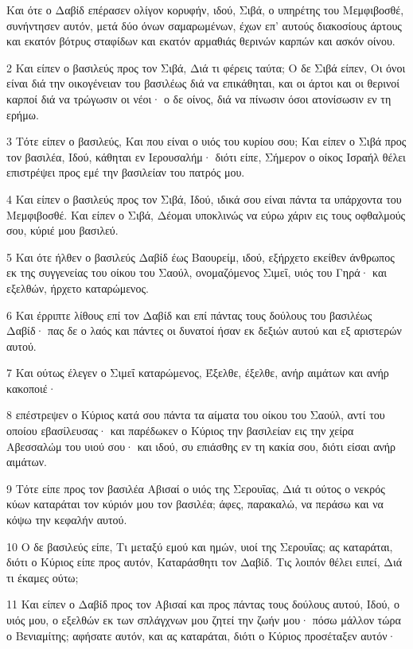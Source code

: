 \par Και ότε ο Δαβίδ επέρασεν ολίγον κορυφήν, ιδού, Σιβά, ο υπηρέτης του Μεμφιβοσθέ, συνήντησεν αυτόν, μετά δύο όνων σαμαρωμένων, έχων επ' αυτούς διακοσίους άρτους και εκατόν βότρυς σταφίδων και εκατόν αρμαθιάς θερινών καρπών και ασκόν οίνου.
\par 2 Και είπεν ο βασιλεύς προς τον Σιβά, Διά τι φέρεις ταύτα; Ο δε Σιβά είπεν, Οι όνοι είναι διά την οικογένειαν του βασιλέως διά να επικάθηται, και οι άρτοι και οι θερινοί καρποί διά να τρώγωσιν οι νέοι· ο δε οίνος, διά να πίνωσιν όσοι ατονίσωσιν εν τη ερήμω.
\par 3 Τότε είπεν ο βασιλεύς, Και που είναι ο υιός του κυρίου σου; Και είπεν ο Σιβά προς τον βασιλέα, Ιδού, κάθηται εν Ιερουσαλήμ· διότι είπε, Σήμερον ο οίκος Ισραήλ θέλει επιστρέψει προς εμέ την βασιλείαν του πατρός μου.
\par 4 Και είπεν ο βασιλεύς προς τον Σιβά, Ιδού, ιδικά σου είναι πάντα τα υπάρχοντα του Μεμφιβοσθέ. Και είπεν ο Σιβά, Δέομαι υποκλινώς να εύρω χάριν εις τους οφθαλμούς σου, κύριέ μου βασιλεύ.
\par 5 Και ότε ήλθεν ο βασιλεύς Δαβίδ έως Βαουρείμ, ιδού, εξήρχετο εκείθεν άνθρωπος εκ της συγγενείας του οίκου του Σαούλ, ονομαζόμενος Σιμεΐ, υιός του Γηρά· και εξελθών, ήρχετο καταρώμενος.
\par 6 Και έρριπτε λίθους επί τον Δαβίδ και επί πάντας τους δούλους του βασιλέως Δαβίδ· πας δε ο λαός και πάντες οι δυνατοί ήσαν εκ δεξιών αυτού και εξ αριστερών αυτού.
\par 7 Και ούτως έλεγεν ο Σιμεΐ καταρώμενος, Έξελθε, έξελθε, ανήρ αιμάτων και ανήρ κακοποιέ·
\par 8 επέστρεψεν ο Κύριος κατά σου πάντα τα αίματα του οίκου του Σαούλ, αντί του οποίου εβασίλευσας· και παρέδωκεν ο Κύριος την βασιλείαν εις την χείρα Αβεσσαλώμ του υιού σου· και ιδού, συ επιάσθης εν τη κακία σου, διότι είσαι ανήρ αιμάτων.
\par 9 Τότε είπε προς τον βασιλέα Αβισαί ο υιός της Σερουΐας, Διά τι ούτος ο νεκρός κύων καταράται τον κύριόν μου τον βασιλέα; άφες, παρακαλώ, να περάσω και να κόψω την κεφαλήν αυτού.
\par 10 Ο δε βασιλεύς είπε, Τι μεταξύ εμού και ημών, υιοί της Σερουΐας; ας καταράται, διότι ο Κύριος είπε προς αυτόν, Καταράσθητι τον Δαβίδ. Τις λοιπόν θέλει ειπεί, Διά τι έκαμες ούτω;
\par 11 Και είπεν ο Δαβίδ προς τον Αβισαί και προς πάντας τους δούλους αυτού, Ιδού, ο υιός μου, ο εξελθών εκ των σπλάγχνων μου ζητεί την ζωήν μου· πόσω μάλλον τώρα ο Βενιαμίτης; αφήσατε αυτόν, και ας καταράται, διότι ο Κύριος προσέταξεν αυτόν·
